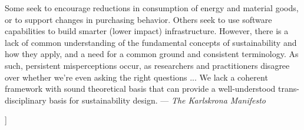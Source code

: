 \documentclass[11pt,twocolumn]{article}
\begin{document}
\begin{@twocolumnfalse}
\begin{lrbox}{\qboxii}
\begin{frquote}Some seek to encourage reductions in consumption of energy
and  material  goods,  or  to  support  changes  in  purchasing
behavior.  Others  seek  to  use  software  capabilities  to  build
smarter (lower impact) infrastructure. However, there is a lack
of  common  understanding  of  the  fundamental  concepts  of
sustainability and how they apply, and a need for a common
ground and consistent terminology. As such, persistent 
misperceptions occur, as researchers and practitioners disagree over
whether we're even asking the right questions ...
We  lack  a  coherent  framework  with  sound  theoretical  basis
that can provide a well-understood trans-disciplinary basis for
sustainability design. --- \textit{The Karlskrona Manifesto} {\cite[p. 5]{Karlskrona}}
\end{frquote}
\end{lrbox}	
\vspace{1em}
\begin{flushright}%
\usebox{\qboxii}
\end{flushright}
\vspace{1em}
\decoline{}
\vspace{3em}
\end{@twocolumnfalse}]









%


\end{document}
